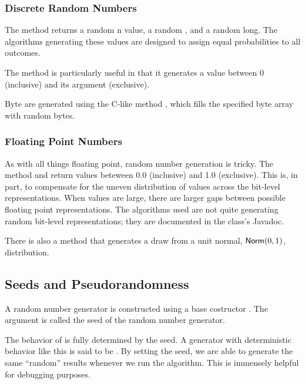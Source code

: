\subsubsection{Discrete Random Numbers}

The method  returns a random n
value,  a random , and  a
random long.  The algorithms generating these values are designed to
assign equal probabilities to all outcomes.  

The method  is particularly useful in that it
generates a value between 0 (inclusive) and its argument (exclusive).

Byte are generated using the C-like method ,
which fills the specified byte array with random bytes.  

\subsubsection{Floating Point Numbers}

As with all things floating point, random number generation is tricky.
The method  and  return values
beteween 0.0 (inclusive) and 1.0 (exclusive).  This is, in part, to
compensate for the uneven distribution of values across the bit-level
representations.  When values are large, there are larger gaps between
possible floating point representations.  The algorithms used are not
quite generating random bit-level representations; they are documented
in the class's Javadoc.

There is also a method  that generates a draw
from a unit normal, $\mbox{\sf Norm}(0,1)$, distribution.


\subsection{Seeds and Pseudorandomness}

A random number generator is constructed using a base costructor
.  The argument is called the seed of the random
number generator.

The behavior of  is fully determined by the seed.  A
generator with deterministic behavior like this is said to be
.  By setting the seed, we are able to
generate the same ``random'' results whenever we run the algorithm.
This is immensely helpful for debugging purposes.

